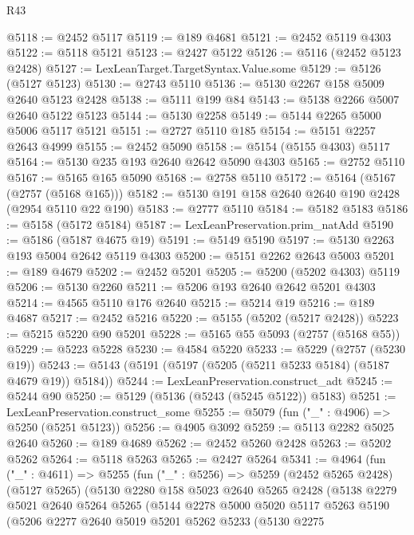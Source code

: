 \begin{lexlean}{R43}
\begin{coremodule}
@5118 := @2452 @5117
@5119 := @189 @4681
@5121 := @2452 @5119 @4303
@5122 := @5118 @5121
@5123 := @2427 @5122
@5126 := @5116 (@2452 @5123 @2428)
@5127 := LexLeanTarget.TargetSyntax.Value.some
@5129 := @5126 (@5127 @5123)
@5130 := @2743 @5110
@5136 := @5130 @2267 @158 @5009 @2640 @5123 @2428
@5138 := @5111 @199 @84
@5143 := @5138 @2266 @5007 @2640 @5122 @5123
@5144 := @5130 @2258
@5149 := @5144 @2265 @5000 @5006 @5117 @5121
@5151 := @2727 @5110 @185
@5154 := @5151 @2257 @2643 @4999
@5155 := @2452 @5090
@5158 := @5154 (@5155 @4303) @5117
@5164 := @5130 @235 @193 @2640 @2642 @5090 @4303
@5165 := @2752 @5110
@5167 := @5165 @165 @5090
@5168 := @2758 @5110
@5172 := @5164 (@5167 (@2757 (@5168 @165)))
@5182 := @5130 @191 @158 @2640 @2640 @190 @2428 (@2954 @5110 @22 @190)
@5183 := @2777 @5110
@5184 := @5182 @5183
@5186 := @5158 (@5172 @5184)
@5187 := LexLeanPreservation.prim_natAdd
@5190 := @5186 (@5187 @4675 @19)
@5191 := @5149 @5190
@5197 := @5130 @2263 @193 @5004 @2642 @5119 @4303
@5200 := @5151 @2262 @2643 @5003
@5201 := @189 @4679
@5202 := @2452 @5201
@5205 := @5200 (@5202 @4303) @5119
@5206 := @5130 @2260
@5211 := @5206 @193 @2640 @2642 @5201 @4303
@5214 := @4565 @5110 @176 @2640
@5215 := @5214 @19
@5216 := @189 @4687
@5217 := @2452 @5216
@5220 := @5155 (@5202 (@5217 @2428))
@5223 := @5215 @5220 @90 @5201
@5228 := @5165 @55 @5093 (@2757 (@5168 @55))
@5229 := @5223 @5228
@5230 := @4584 @5220
@5233 := @5229 (@2757 (@5230 @19))
@5243 := @5143 (@5191 (@5197 (@5205 (@5211 @5233 @5184) (@5187 @4679 @19)) @5184))
@5244 := LexLeanPreservation.construct_adt
@5245 := @5244 @90
@5250 := @5129 (@5136 (@5243 (@5245 @5122)) @5183)
@5251 := LexLeanPreservation.construct_some
@5255 := @5079 (fun ("_" : @4906) => @5250 (@5251 @5123))
@5256 := @4905 @3092
@5259 := @5113 @2282 @5025 @2640
@5260 := @189 @4689
@5262 := @2452 @5260 @2428
@5263 := @5202 @5262
@5264 := @5118 @5263
@5265 := @2427 @5264
@5341 := @4964
    (fun ("_" : @4611) =>
    @5255
      (fun ("_" : @5256) =>
      @5259
        (@2452 @5265 @2428)
        (@5127 @5265)
        (@5130
          @2280
          @158
          @5023
          @2640
          @5265
          @2428
          (@5138
            @2279
            @5021
            @2640
            @5264
            @5265
            (@5144
              @2278
              @5000
              @5020
              @5117
              @5263
              @5190
              (@5206
                @2277
                @2640
                @5019
                @5201
                @5262
                @5233
                (@5130
                  @2275

\end{coremodule}
\end{lexlean}
